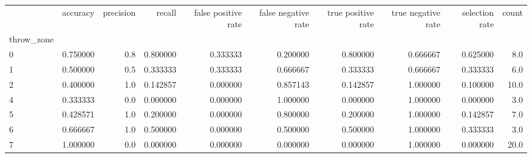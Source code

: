\begin{tabular}{lrrrrrrrrr}
\toprule
{} &  accuracy &  precision &    recall &  false positive rate &  false negative rate &  true positive rate &  true negative rate &  selection rate &  count \\
throw\_zone &           &            &           &                      &                      &                     &                     &                 &        \\
\midrule
0          &  0.750000 &        0.8 &  0.800000 &             0.333333 &             0.200000 &            0.800000 &            0.666667 &        0.625000 &    8.0 \\
1          &  0.500000 &        0.5 &  0.333333 &             0.333333 &             0.666667 &            0.333333 &            0.666667 &        0.333333 &    6.0 \\
2          &  0.400000 &        1.0 &  0.142857 &             0.000000 &             0.857143 &            0.142857 &            1.000000 &        0.100000 &   10.0 \\
4          &  0.333333 &        0.0 &  0.000000 &             0.000000 &             1.000000 &            0.000000 &            1.000000 &        0.000000 &    3.0 \\
5          &  0.428571 &        1.0 &  0.200000 &             0.000000 &             0.800000 &            0.200000 &            1.000000 &        0.142857 &    7.0 \\
6          &  0.666667 &        1.0 &  0.500000 &             0.000000 &             0.500000 &            0.500000 &            1.000000 &        0.333333 &    3.0 \\
7          &  1.000000 &        0.0 &  0.000000 &             0.000000 &             0.000000 &            0.000000 &            1.000000 &        0.000000 &   20.0 \\
\bottomrule
\end{tabular}
